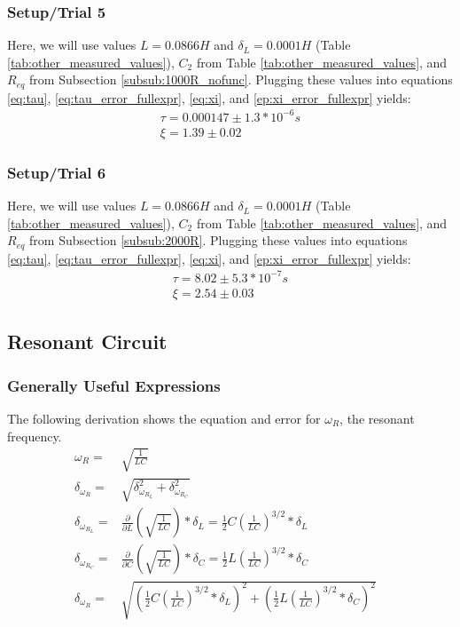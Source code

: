 \documentclass[12pt]{article}
\newcommand{\paren}[1]{\left( {#1} \right)}
\begin{document}
\subsubsection{Setup/Trial 5}
Here, we will use values $L=0.0866H$ and $\delta_L=0.0001H$ (Table \ref{tab:other_measured_values}), $C_2$ from Table \ref{tab:other_measured_values}, and $R_{eq}$ from Subsection \ref{subsub:1000R_nofunc}. Plugging these values into equations \ref{eq:tau}, \ref{eq:tau_error_fullexpr}, \ref{eq:xi}, and \ref{ep:xi_error_fullexpr} yields:
\begin{align}
	\tau=0.000147\pm1.3*10^{-6} s \label{num:tau_trial_five} \\
	\xi=1.39\pm0.02 \label{num:xi_trial_five}
\end{align}

\subsubsection{Setup/Trial 6}
Here, we will use values $L=0.0866H$ and $\delta_L=0.0001H$ (Table \ref{tab:other_measured_values}), $C_2$ from Table \ref{tab:other_measured_values}, and $R_{eq}$ from Subsection \ref{subsub:2000R}. Plugging these values into equations \ref{eq:tau}, \ref{eq:tau_error_fullexpr}, \ref{eq:xi}, and \ref{ep:xi_error_fullexpr} yields:
\begin{align}
	\tau=8.02\pm5.3*10^{-7} s \label{num:tau_trial_six} \\
	\xi=2.54\pm0.03 \label{num:xi_trial_six}
\end{align}

\clearpage
\subsection{Resonant Circuit}
\subsubsection{Generally Useful Expressions}
The following derivation shows the equation and error for $\omega_R$, the resonant frequency.
\begin{align}
	\omega_R=&\sqrt{\frac{1}{LC}} \label{eq:omega_R} \\
	\delta_{\omega_R}=&\sqrt{\delta_{\omega_{R_{L}}}^2+\delta_{\omega_{R_{C}}}^2}  \label{eq:omega_R_error} \\
	\delta_{\omega_{R_{L}}}=&\frac{\partial}{\partial L}\paren{\sqrt{\frac{1}{LC}}}*\delta_L=\frac{1}{2}C\paren{\frac{1}{LC}}^{3/2}*\delta_L \nonumber \\
	\delta_{\omega_{R_{C}}}=&\frac{\partial}{\partial C}\paren{\sqrt{\frac{1}{LC}}}*\delta_C=\frac{1}{2}L\paren{\frac{1}{LC}}^{3/2}*\delta_C \nonumber \\
	\delta_{\omega_R}=&\sqrt{\paren{\frac{1}{2}C\paren{\frac{1}{LC}}^{3/2}*\delta_L}^2+\paren{\frac{1}{2}L\paren{\frac{1}{LC}}^{3/2}*\delta_C}^2}& \label{eq:omega_R_error_fullexpr}
\end{align}
\end{document}
